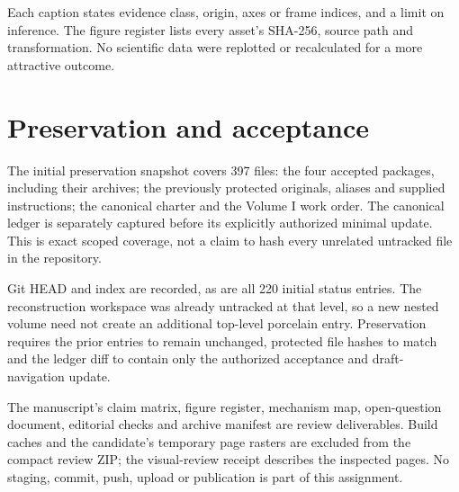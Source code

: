 Each caption states evidence class, origin, axes or frame indices,
and a limit on inference. The figure register lists every asset's
SHA-256, source path and transformation. No scientific data were
replotted or recalculated for a more attractive outcome.

\section{Preservation and acceptance}
The initial preservation snapshot covers 397 files: the four
accepted packages, including their archives; the previously
protected originals, aliases and supplied instructions; the
canonical charter and the Volume I work order. The canonical
ledger is separately captured before its explicitly authorized
minimal update. This is exact scoped coverage, not a claim to
hash every unrelated untracked file in the repository.

Git HEAD and index are recorded, as are all 220 initial status
entries. The reconstruction workspace was already untracked at
that level, so a new nested volume need not create an additional
top-level porcelain entry. Preservation requires the prior
entries to remain unchanged, protected file hashes to match and
the ledger diff to contain only the authorized acceptance and
draft-navigation update.

The manuscript's claim matrix, figure register, mechanism map,
open-question document, editorial checks and archive manifest
are review deliverables. Build caches and the candidate's
temporary page rasters are excluded from the compact review ZIP;
the visual-review receipt describes the inspected pages.
No staging, commit, push, upload or publication is part of this
assignment.
